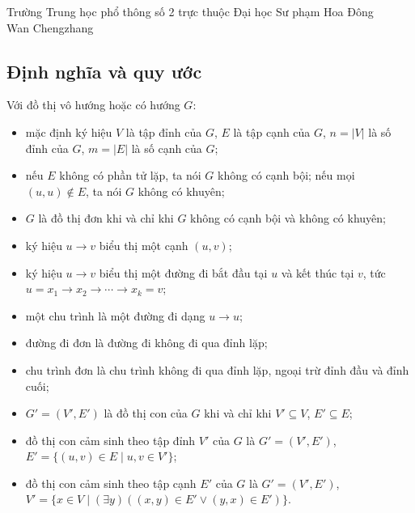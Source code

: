 \documentclass[11pt]{article}
\renewcommand{\leadsto}{\mathrel{\longrightarrow}}
\begin{document}
\begin{center}
Trường Trung học phổ thông số 2 trực thuộc Đại học Sư phạm Hoa Đông\\
Wan Chengzhang
\end{center}

\renewcommand{\abstractname}{Tóm tắt}
\begin{abstract}
Bài viết này chia thành hai phần: đồ thị vô hướng và đồ thị có hướng. Nội dung
thảo luận một số tư tưởng thuật toán về tính liên thông có tính thực dụng trong
thi tin học; ngoài ra còn khảo sát thêm một số bài toán lý thuyết đồ thị có liên
hệ nhất định với tính liên thông.
\end{abstract}

\subsection{Định nghĩa và quy ước}

Với đồ thị vô hướng hoặc có hướng $G$:
\begin{itemize}
  \item mặc định ký hiệu $V$ là tập đỉnh của $G$, $E$ là tập cạnh của $G$,
  $n=|V|$ là số đỉnh của $G$, $m=|E|$ là số cạnh của $G$;
  \item nếu $E$ không có phần tử lặp, ta nói $G$ không có cạnh bội; nếu mọi
  $(u,u)\notin E$, ta nói $G$ không có khuyên;
  \item $G$ là đồ thị đơn khi và chỉ khi $G$ không có cạnh bội và không có
  khuyên;
  \item ký hiệu $u \to v$ biểu thị một cạnh $(u,v)$;
  \item ký hiệu $u \leadsto v$ biểu thị một đường đi bắt đầu tại $u$ và kết
  thúc tại $v$, tức $u=x_1\to x_2\to\cdots\to x_k=v$;
  \item một chu trình là một đường đi dạng $u\leadsto u$;
  \item đường đi đơn là đường đi không đi qua đỉnh lặp;
  \item chu trình đơn là chu trình không đi qua đỉnh lặp, ngoại trừ đỉnh đầu và
  đỉnh cuối;
  \item $G'=(V',E')$ là đồ thị con của $G$ khi và chỉ khi $V'\subseteq V$,
  $E'\subseteq E$;
  \item đồ thị con cảm sinh theo tập đỉnh $V'$ của $G$ là
  $G'=(V',E')$, $E'=\{(u,v)\in E\mid u,v\in V'\}$;
  \item đồ thị con cảm sinh theo tập cạnh $E'$ của $G$ là
  $G'=(V',E')$, $V'=\{x\in V\mid(\exists y)((x,y)\in E'\lor(y,x)\in E')\}$.
\end{itemize}
\end{document}
